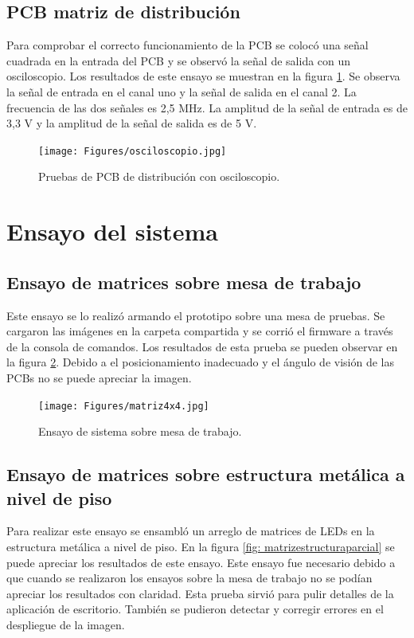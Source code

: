 \subsection{PCB matriz de distribución}
Para comprobar el correcto funcionamiento de la PCB se colocó una señal cuadrada en la entrada del PCB y se observó la señal de salida con un osciloscopio. Los resultados de este ensayo se muestran en la figura \ref{fig: capturaosciloscopio}. Se observa la señal de entrada en el canal uno y la señal de salida en el canal 2. La frecuencia de las dos señales es 2,5 MHz. La amplitud de la señal de entrada es de 3,3 V y la amplitud de la señal de salida es de 5 V. 

\begin{figure}[htpb]
	\centering
	\texttt{[image: Figures/osciloscopio.jpg]} 
	\caption{Pruebas de PCB de distribución con osciloscopio.}
	\label{fig: capturaosciloscopio}
\end{figure}




\section{Ensayo del sistema}
\subsection{Ensayo de matrices sobre mesa de trabajo}
Este ensayo se lo realizó armando el prototipo sobre una mesa de pruebas. Se cargaron las imágenes en la carpeta compartida y se corrió el firmware a través de la consola de comandos. Los resultados de esta prueba se pueden observar en la figura \ref{fig: matriz4x4}. Debido a el posicionamiento inadecuado y el ángulo de visión de las PCBs no se puede apreciar la imagen.

\begin{figure}[htpb]
	\centering
	\texttt{[image: Figures/matriz4x4.jpg]} 
	\caption{Ensayo de sistema sobre mesa de trabajo.}
	\label{fig: matriz4x4}
\end{figure}

\subsection{Ensayo de matrices sobre estructura metálica a nivel de piso}
Para realizar este ensayo se ensambló un arreglo de matrices de LEDs en la estructura metálica a nivel de piso. En la figura \ref{fig: matrizestructuraparcial} se puede apreciar los resultados de este ensayo. Este ensayo fue necesario debido a que cuando se realizaron los ensayos sobre la mesa de trabajo no se podían apreciar los resultados con claridad. Esta prueba sirvió para pulir detalles de la aplicación de escritorio. También se pudieron detectar y corregir errores en el despliegue de la imagen.

